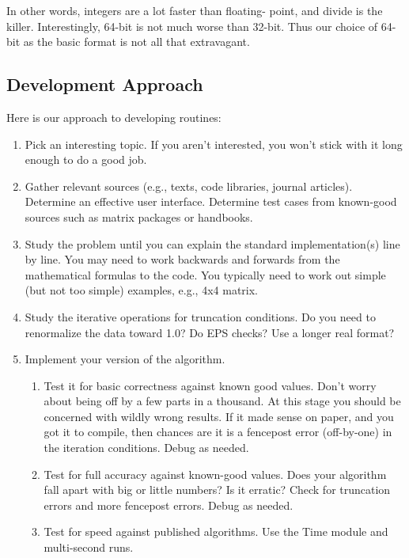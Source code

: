 In other words, integers are a lot faster than floating-
point, and divide is the killer.  Interestingly, 64-bit is
not much worse than 32-bit.  Thus our choice of 64-bit as
the basic format is not all that extravagant.


\subsection{Development Approach}
Here is our approach to developing routines:
\begin{enumerate}
     \item Pick an interesting topic.  If you aren't
     interested, you won't stick with it long enough to do a
     good job.
     
     \item Gather relevant sources (e.g., texts, code
     libraries, journal articles).  Determine an effective
     user interface.  Determine test cases from known-good
     sources such as matrix packages or handbooks.
     
     \item Study the problem until you can explain the standard
     implementation(s) line by line.  You may need to work
     backwards and forwards from the mathematical formulas
     to the code.  You typically need to work out simple
     (but not too simple) examples, e.g., 4x4 matrix.
     
     \item Study the iterative operations for truncation
     conditions.  Do you need to renormalize the data toward
     1.0?  Do EPS checks?  Use a longer real format?
     
     \item Implement your version of the algorithm.
     \begin{enumerate}
          \item Test it for basic correctness against known
          good values.  Don't worry about being off by a few
          parts in a thousand.  At this stage you should be
          concerned with wildly wrong results.  If it made
          sense on paper, and you got it to compile, then
          chances are it is a fencepost error (off-by-one)
          in the iteration conditions.  Debug as needed.
          
          \item Test for full accuracy against known-good
          values.  Does your algorithm fall apart with big
          or little numbers?  Is it erratic?  Check for
          truncation errors and more fencepost errors.
          Debug as needed.
          
          \item Test for speed against published algorithms.
          Use the Time module and multi-second runs.
       \end{enumerate}
\end{enumerate}

